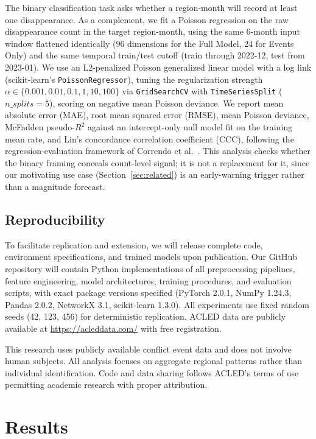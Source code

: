 \documentclass[pdflatex,sn-mathphys-num]{sn-jnl}%
\theoremstyle{thmstyleone}%
\theoremstyle{thmstyletwo}%
\theoremstyle{thmstylethree}%
\begin{document}
The binary classification task asks whether a region-month will record at least one disappearance. As a complement, we fit a Poisson regression on the raw disappearance count in the target region-month, using the same 6-month input window flattened identically (96 dimensions for the Full Model, 24 for Events Only) and the same temporal train/test cutoff (train through 2022-12, test from 2023-01). We use an L2-penalized Poisson generalized linear model with a log link (scikit-learn's \texttt{PoissonRegressor}), tuning the regularization strength $\alpha \in \{0.001, 0.01, 0.1, 1, 10, 100\}$ via \texttt{GridSearchCV} with \texttt{TimeSeriesSplit} ($n\_splits=5$), scoring on negative mean Poisson deviance. We report mean absolute error (MAE), root mean squared error (RMSE), mean Poisson deviance, McFadden pseudo-$R^2$ against an intercept-only null model fit on the training mean rate, and Lin's concordance correlation coefficient (CCC), following the regression-evaluation framework of Correndo et al.~\cite{correndo2022metrica}. This analysis checks whether the binary framing conceals count-level signal; it is not a replacement for it, since our motivating use case (Section~\ref{sec:related}) is an early-warning trigger rather than a magnitude forecast.

\subsection{Reproducibility}

To facilitate replication and extension, we will release complete code, environment specifications, and trained models upon publication. Our GitHub repository will contain Python implementations of all preprocessing pipelines, feature engineering, model architectures, training procedures, and evaluation scripts, with exact package versions specified (PyTorch 2.0.1, NumPy 1.24.3, Pandas 2.0.2, NetworkX 3.1, scikit-learn 1.3.0). All experiments use fixed random seeds (42, 123, 456) for deterministic replication. ACLED data are publicly available at \url{https://acleddata.com/} with free registration.

This research uses publicly available conflict event data and does not involve human subjects. All analysis focuses on aggregate regional patterns rather than individual identification. Code and data sharing follows ACLED's terms of use permitting academic research with proper attribution.

\section{Results}\label{sec:results}
\end{document}
